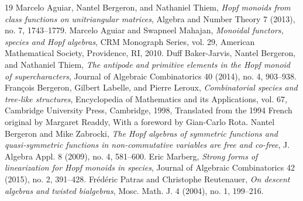 \begin{thebibliography}{19}
 Marcelo Aguiar, Nantel Bergeron, and Nathaniel Thiem, \emph{Hopf monoids from class functions on unitriangular matrices}, Algebra and Number Theory 7 (2013), no. 7, 1743--1779.
 Marcelo Aguiar and Swapneel Mahajan, \emph{Monoidal functors, species and Hopf algebras}, CRM Monograph Series, vol. 29, American Mathematical Society, Providence, RI, 2010.
 Duff Baker-Jarvis, Nantel Bergeron, and Nathaniel Thiem, \emph{The antipode and primitive elements in the Hopf monoid of supercharacters}, Journal of Algebraic Combinatorics 40 (2014), no. 4, 903--938.
 Fran\c{c}ois Bergeron, Gilbert Labelle, and Pierre Leroux, \emph{Combinatorial species and tree-like structures}, Encyclopedia of Mathematics and its Applications, vol. 67, Cambridge University Press, Cambridge, 1998, Translated from the 1994 French original by Margaret Readdy, With a foreword by Gian-Carlo Rota.
 Nantel Bergeron and Mike Zabrocki, \emph{The Hopf algebras of symmetric functions and quasi-symmetric functions in non-commutative variables are free and co-free}, J. Algebra Appl. 8 (2009), no. 4, 581--600.
 Eric Marberg, \emph{Strong forms of linearization for Hopf monoids in species}, Journal of Algebraic Combinatorics 42 (2015), no. 2, 391--428.
 Fr\'ed\'eric Patras and Christophe Reutenauer, \emph{On descent algebras and twisted bialgebras}, Mosc. Math. J. 4 (2004), no. 1, 199--216.
\end{thebibliography}
